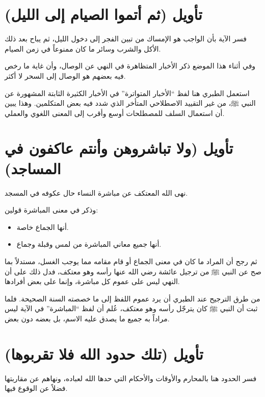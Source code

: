 \section{تأويل (ثم أتموا الصيام إلى الليل)}
فسر  الآية بأن الواجب هو الإمساك من تبين الفجر إلى دخول الليل، ثم يباح بعد ذلك الأكل والشرب وسائر ما كان ممنوعاً في زمن الصيام.

وفي أثناء هذا الموضع ذكر  الأخبار المتظاهرة في النهي عن الوصال، وأن غاية ما رخص فيه بعضهم هو الوصال إلى السحر لا أكثر.

\begin{fawaid}
استعمل الطبري هنا لفظ ``الأخبار المتواترة'' في الأخبار الكثيرة الثابتة المشهورة عن النبي ﷺ، من غير التقييد الاصطلاحي المتأخر الذي شدد فيه بعض المتكلمين. وهذا يبين أن استعمال السلف للمصطلحات أوسع وأقرب إلى المعنى اللغوي والعملي.
\end{fawaid}

\separator

\section{تأويل (ولا تباشروهن وأنتم عاكفون في المساجد)}
 نهى الله المعتكف عن مباشرة النساء حال عكوفه في المسجد.

وذكر  في معنى المباشرة قولين:
\begin{itemize}
    \item أنها الجماع خاصة.
    \item أنها جميع معاني المباشرة من لمس وقبلة وجماع.
\end{itemize}

ثم رجح أن المراد ما كان في معنى الجماع أو قام مقامه مما يوجب الغسل، مستدلاً بما صح عن النبي ﷺ من ترجيل عائشة رضي الله عنها رأسه وهو معتكف، فدل ذلك على أن النهي ليس على عموم كل مباشرة، وإنما على بعض أفرادها.

\begin{fawaid}
من طرق الترجيح عند الطبري أن يرد عموم اللفظ إلى ما خصصته السنة الصحيحة. فلما ثبت أن النبي ﷺ كان يترجّل رأسه وهو معتكف، عُلم أن لفظ ``المباشرة'' في الآية ليس مراداً به جميع ما يصدق عليه الاسم، بل بعضه دون بعض.
\end{fawaid}

\section{تأويل (تلك حدود الله فلا تقربوها)}
فسر  الحدود هنا بالمحارم والأوقات والأحكام التي حدها الله لعباده، ونهاهم عن مقاربتها فضلاً عن الوقوع فيها.

